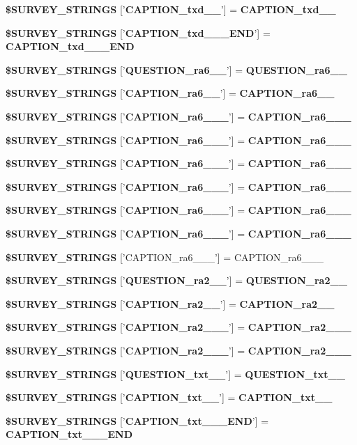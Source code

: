 \begin{CompactItemize}
{\bf \$SURVEY\_\-STRINGS} ['{\bf CAPTION\_\-txd\_\_\-}'] = {\bf CAPTION\_\-txd\_\_\-}
\item 
{\bf \$SURVEY\_\-STRINGS} ['{\bf CAPTION\_\-txd\_\_\-\_\-END}'] = {\bf CAPTION\_\-txd\_\_\-\_\-END}
\item 
{\bf \$SURVEY\_\-STRINGS} ['{\bf QUESTION\_\-ra6\_\_\-}'] = {\bf QUESTION\_\-ra6\_\_\-}
\item 
{\bf \$SURVEY\_\-STRINGS} ['{\bf CAPTION\_\-ra6\_\_\-}'] = {\bf CAPTION\_\-ra6\_\_\-}
\item 
{\bf \$SURVEY\_\-STRINGS} ['{\bf CAPTION\_\-ra6\_\_\-\_}'] = {\bf CAPTION\_\-ra6\_\_\-\_}
\item 
{\bf \$SURVEY\_\-STRINGS} ['{\bf CAPTION\_\-ra6\_\_\-\_}'] = {\bf CAPTION\_\-ra6\_\_\-\_}
\item 
{\bf \$SURVEY\_\-STRINGS} ['{\bf CAPTION\_\-ra6\_\_\-\_}'] = {\bf CAPTION\_\-ra6\_\_\-\_}
\item 
{\bf \$SURVEY\_\-STRINGS} ['{\bf CAPTION\_\-ra6\_\_\-\_}'] = {\bf CAPTION\_\-ra6\_\_\-\_}
\item 
{\bf \$SURVEY\_\-STRINGS} ['{\bf CAPTION\_\-ra6\_\_\-\_}'] = {\bf CAPTION\_\-ra6\_\_\-\_}
\item 
{\bf \$SURVEY\_\-STRINGS} ['{\bf CAPTION\_\-ra6\_\_\-\_}'] = {\bf CAPTION\_\-ra6\_\_\-\_}
\item 
{\bf \$SURVEY\_\-STRINGS} ['CAPTION\_\-ra6\_\_\-\_'] = CAPTION\_\-ra6\_\_\-\_
\item 
{\bf \$SURVEY\_\-STRINGS} ['{\bf QUESTION\_\-ra2\_\_\-}'] = {\bf QUESTION\_\-ra2\_\_\-}
\item 
{\bf \$SURVEY\_\-STRINGS} ['{\bf CAPTION\_\-ra2\_\_\-}'] = {\bf CAPTION\_\-ra2\_\_\-}
\item 
{\bf \$SURVEY\_\-STRINGS} ['{\bf CAPTION\_\-ra2\_\_\-\_}'] = {\bf CAPTION\_\-ra2\_\_\-\_}
\item 
{\bf \$SURVEY\_\-STRINGS} ['{\bf CAPTION\_\-ra2\_\_\-\_}'] = {\bf CAPTION\_\-ra2\_\_\-\_}
\item 
{\bf \$SURVEY\_\-STRINGS} ['{\bf QUESTION\_\-txt\_\_\-}'] = {\bf QUESTION\_\-txt\_\_\-}
\item 
{\bf \$SURVEY\_\-STRINGS} ['{\bf CAPTION\_\-txt\_\_\-}'] = {\bf CAPTION\_\-txt\_\_\-}
\item 
{\bf \$SURVEY\_\-STRINGS} ['{\bf CAPTION\_\-txt\_\_\-\_\-END}'] = {\bf CAPTION\_\-txt\_\_\-\_\-END}

\end{CompactItemize}
